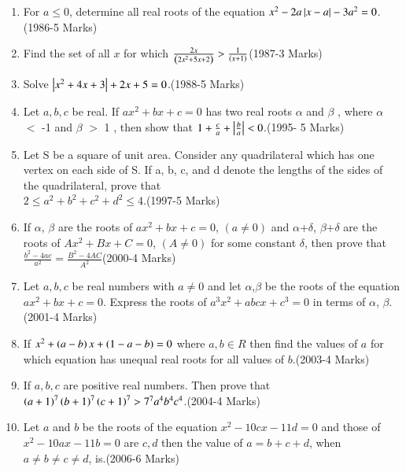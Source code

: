 \documentclass[journal,12pt,twocolumn]{IEEEtran}
\theoremstyle{remark}
\begin{document}
\begin{enumerate}[start=13]
 \item For $a \leq 0$, determine all real roots of the equation $x^2-2a\left\vert x-a\right\vert-3a^2=0$.\hfill{(1986-5 Marks)}
 \item Find the set of all $x$ for which $\frac{2x}{\left(2x^2+5x+2\right)}>\frac{1}{\left(x+1\right)}$\hfill{(1987-3 Marks)}
 \item Solve $\left\vert x^2+4x+3\right\vert+2x+5=0$.\hfill{(1988-5 Marks)}
 \item Let $a,b,c$ be real. If $ax^2+bx+c=0$ has two real roots $\alpha$ and $\beta$ , where $\alpha$ $<$ -1 and $\beta$ $>$ 1 , then show that $1+\frac{c}{a}+\left\vert\frac{b}{a}\right\vert<0$.\hfill{(1995- 5 Marks)}
 \item Let S be a square of unit area. Consider any quadrilateral which has one vertex on each side of S. If a, b, c, and d denote the lengths of the sides of the quadrilateral, prove that \\$2 \leq a^2+b^2+c^2+d^2 \leq 4$.\hfill{(1997-5 Marks)}
 \item If $\alpha$, $\beta$ are the roots of $ax^2+bx+c=0$, $(a\neq 0)$ and $\alpha$+$\delta$, $\beta$+$\delta$ are the roots of $Ax^2+Bx+C=0$, $(A\neq 0)$ for some constant $\delta$, then prove that $\frac{b^2-4ac}{a^2}=\frac{B^2-4AC}{A^2}$\hfill{(2000-4 Marks)}
 \item Let $a, b,c $ be real numbers with $a\neq0$ and let $\alpha$,$\beta$ be the roots of the equation $ax^2+bx+c=0$. Express the roots of $a^3x^2+abcx+c^3=0$ in terms of $\alpha$, $\beta$.\hfill{(2001-4 Marks)}
\item If $x^2+\left(a-b\right)x+\left(1-a-b\right)=0$ where $a, b\in R$ then find the values of $a$ for which equation has unequal real roots for all values of $b$.\hfill{(2003-4 Marks)}
\item If $a, b, c$ are positive real numbers. Then prove that $\left(a+1\right)^7\left(b+1\right)^7\left(c+1\right)^7 > 7^7a^4b^4c^4$.\hfill{(2004-4 Marks)}
\item Let $a$ and $b$ be the roots of the equation $x^2-10cx-11d=0$ and those of $x^2-10ax-11b=0$ are $c,d $ then the value of $a=b+c+d$, when $a\neq b\neq c\neq d$, is.\hfill{(2006-6 Marks)}


\end{enumerate}
\bigskip
\end{document}
